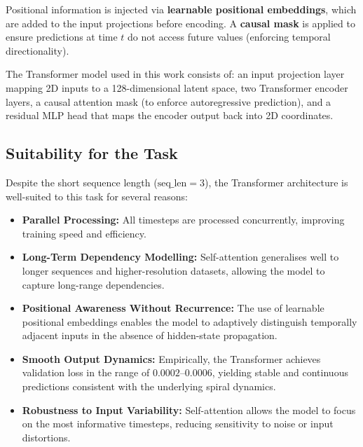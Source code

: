Positional information is injected via \textbf{learnable positional embeddings}, which are added to the input projections before encoding. A \textbf{causal mask} is applied to ensure predictions at time $t$ do not access future values (enforcing temporal directionality).

The Transformer model used in this work consists of: an input projection layer mapping 2D inputs to a 128-dimensional latent space, two Transformer encoder layers, a causal attention mask (to enforce autoregressive prediction), and a residual MLP head that maps the encoder output back into 2D coordinates.

\subsection*{Suitability for the Task}

Despite the short sequence length ($\text{seq\_len} = 3$), the Transformer architecture is well-suited to this task for several reasons:


\begin{itemize}
    \item \textbf{Parallel Processing:} All timesteps are processed concurrently, improving training speed and efficiency.
    
    \item \textbf{Long-Term Dependency Modelling:} Self-attention generalises well to longer sequences and higher-resolution datasets, allowing the model to capture long-range dependencies.
    
    \item \textbf{Positional Awareness Without Recurrence:} The use of learnable positional embeddings enables the model to adaptively distinguish temporally adjacent inputs in the absence of hidden-state propagation.

    \item \textbf{Smooth Output Dynamics:} Empirically, the Transformer achieves validation loss in the range of $0.0002$–$0.0006$, yielding stable and continuous predictions consistent with the underlying spiral dynamics.
    
    \item \textbf{Robustness to Input Variability:} Self-attention allows the model to focus on the most informative timesteps, reducing sensitivity to noise or input distortions.
\end{itemize}



